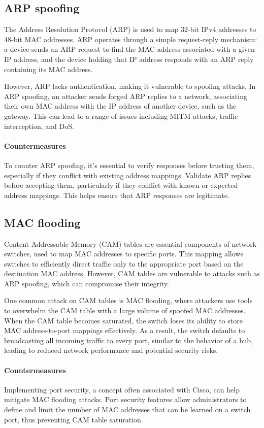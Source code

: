 \subsection{ARP spoofing}
The Address Resolution Protocol (ARP) is used to map 32-bit IPv4 addresses to 48-bit MAC addresses. 
ARP operates through a simple request-reply mechanism: a device sends an ARP request to find the MAC address associated with a given IP address, and the device holding that IP address responds with an ARP reply containing its MAC address.

However, ARP lacks authentication, making it vulnerable to spoofing attacks. In ARP spoofing, an attacker sends forged ARP replies to a network, associating their own MAC address with the IP address of another device, such as the gateway. 
This can lead to a range of issues including MITM attacks, traffic interception, and DoS.

\paragraph*{Countermeasures}
To counter ARP spoofing, it's essential to verify responses before trusting them, especially if they conflict with existing address mappings. 
Validate ARP replies before accepting them, particularly if they conflict with known or expected address mappings. 
This helps ensure that ARP responses are legitimate.

\subsection{MAC flooding}
Content Addressable Memory (CAM) tables are essential components of network switches, used to map MAC addresses to specific ports. 
This mapping allows switches to efficiently direct traffic only to the appropriate port based on the destination MAC address.
However, CAM tables are vulnerable to attacks such as ARP spoofing, which can compromise their integrity.

One common attack on CAM tables is MAC flooding, where attackers use tools to overwhelm the CAM table with a large volume of spoofed MAC addresses. 
When the CAM table becomes saturated, the switch loses its ability to store MAC address-to-port mappings effectively. 
As a result, the switch defaults to broadcasting all incoming traffic to every port, similar to the behavior of a hub, leading to reduced network performance and potential security risks.

\paragraph*{Countermeasures}
Implementing port security, a concept often associated with Cisco, can help mitigate MAC flooding attacks. 
Port security features allow administrators to define and limit the number of MAC addresses that can be learned on a switch port, thus preventing CAM table saturation.

